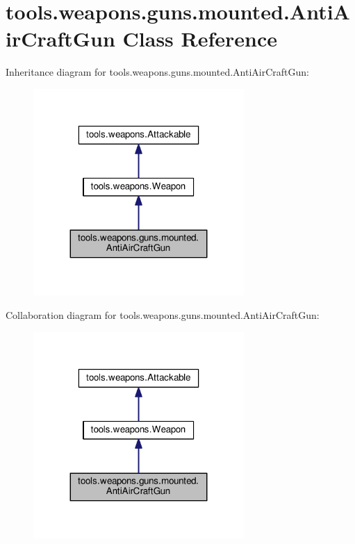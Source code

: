 \hypertarget{classtools_1_1weapons_1_1guns_1_1mounted_1_1_anti_air_craft_gun}{}\section{tools.\+weapons.\+guns.\+mounted.\+Anti\+Air\+Craft\+Gun Class Reference}
\label{classtools_1_1weapons_1_1guns_1_1mounted_1_1_anti_air_craft_gun}


Inheritance diagram for tools.\+weapons.\+guns.\+mounted.\+Anti\+Air\+Craft\+Gun\+:\nopagebreak
\begin{figure}[H]
\begin{center}
\leavevmode
\includegraphics[width=227pt]{classtools_1_1weapons_1_1guns_1_1mounted_1_1_anti_air_craft_gun__inherit__graph}
\end{center}
\end{figure}


Collaboration diagram for tools.\+weapons.\+guns.\+mounted.\+Anti\+Air\+Craft\+Gun\+:\nopagebreak
\begin{figure}[H]
\begin{center}
\leavevmode
\includegraphics[width=227pt]{classtools_1_1weapons_1_1guns_1_1mounted_1_1_anti_air_craft_gun__coll__graph}
\end{center}
\end{figure}
